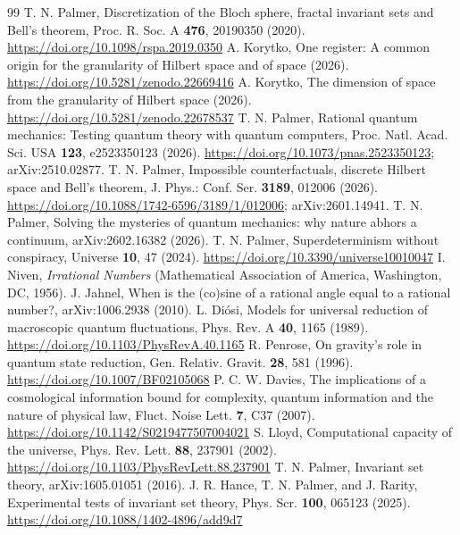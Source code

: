 \documentclass[aps,prd,twocolumn,superscriptaddress,nofootinbib,showkeys]{revtex4-2}
\begin{document}
\begin{thebibliography}{99}
 T. N. Palmer, Discretization of the Bloch sphere, fractal invariant sets and Bell's theorem, Proc. R. Soc. A \textbf{476}, 20190350 (2020). \url{https://doi.org/10.1098/rspa.2019.0350}
 A. Korytko, One register: A common origin for the granularity of Hilbert space and of space (2026). \url{https://doi.org/10.5281/zenodo.22669416}
 A. Korytko, The dimension of space from the granularity of Hilbert space (2026). \url{https://doi.org/10.5281/zenodo.22678537}
 T. N. Palmer, Rational quantum mechanics: Testing quantum theory with quantum computers, Proc. Natl. Acad. Sci. USA \textbf{123}, e2523350123 (2026). \url{https://doi.org/10.1073/pnas.2523350123}; arXiv:2510.02877.
 T. N. Palmer, Impossible counterfactuals, discrete Hilbert space and Bell's theorem, J. Phys.: Conf. Ser. \textbf{3189}, 012006 (2026). \url{https://doi.org/10.1088/1742-6596/3189/1/012006}; arXiv:2601.14941.
 T. N. Palmer, Solving the mysteries of quantum mechanics: why nature abhors a continuum, arXiv:2602.16382 (2026).
 T. N. Palmer, Superdeterminism without conspiracy, Universe \textbf{10}, 47 (2024). \url{https://doi.org/10.3390/universe10010047}
 I. Niven, \emph{Irrational Numbers} (Mathematical Association of America, Washington, DC, 1956).
 J. Jahnel, When is the (co)sine of a rational angle equal to a rational number?, arXiv:1006.2938 (2010).
 L. Di\'osi, Models for universal reduction of macroscopic quantum fluctuations, Phys. Rev. A \textbf{40}, 1165 (1989). \url{https://doi.org/10.1103/PhysRevA.40.1165}
 R. Penrose, On gravity's role in quantum state reduction, Gen. Relativ. Gravit. \textbf{28}, 581 (1996). \url{https://doi.org/10.1007/BF02105068}
 P. C. W. Davies, The implications of a cosmological information bound for complexity, quantum information and the nature of physical law, Fluct. Noise Lett. \textbf{7}, C37 (2007). \url{https://doi.org/10.1142/S0219477507004021}
 S. Lloyd, Computational capacity of the universe, Phys. Rev. Lett. \textbf{88}, 237901 (2002). \url{https://doi.org/10.1103/PhysRevLett.88.237901}
 T. N. Palmer, Invariant set theory, arXiv:1605.01051 (2016).
 J. R. Hance, T. N. Palmer, and J. Rarity, Experimental tests of invariant set theory, Phys. Scr. \textbf{100}, 065123 (2025). \url{https://doi.org/10.1088/1402-4896/add9d7}

\end{thebibliography}
\end{document}
